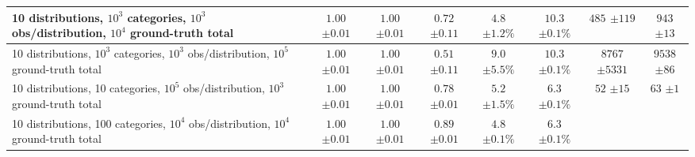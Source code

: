 \begin{table*}
\begin{center}
\begin{scriptsize}
\begin{sc}
\begin{tabular}{l||c|c|c||c|c||c|c}
\hline
\makecell{10 distributions, $10^3$ categories,\\$10^3$ obs/distribution, $10^4$ ground-truth total} & 
\makecell{$1.00$\\$\pm 0.01$} & \makecell{$1.00$\\$\pm 0.01$} & \makecell{$0.72$\\$\pm 0.11$} & 
\makecell{$4.8$\\$\pm 1.2\%$} & \makecell{$10.3$\\$\pm 0.1\%$} & 
\makecell{$485$\\$\pm 119$} & \makecell{$943$\\$\pm 13$} \\
\hline
\makecell{10 distributions, $10^3$ categories,\\$10^3$ obs/distribution, $10^5$ ground-truth total} & 
\makecell{$1.00$\\$\pm 0.01$} & \makecell{$1.00$\\$\pm 0.01$} & \makecell{$0.51$\\$\pm 0.11$} & 
\makecell{$9.0$\\$\pm 5.5\%$} & \makecell{$10.3$\\$\pm 0.1\%$} & 
\makecell{$8767$\\$\pm 5331$} & \makecell{$9538$\\$\pm 86$} \\
\hline
\makecell{10 distributions, 10 categories,\\$10^5$ obs/distribution, $10^3$ ground-truth total} & 
\makecell{$1.00$\\$\pm 0.01$} & \makecell{$1.00$\\$\pm 0.01$} & \makecell{$0.78$\\$\pm 0.01$} & 
\makecell{$5.2$\\$\pm 1.5\%$} & \makecell{$6.3$\\$\pm 0.1\%$} & 
\makecell{$52$\\$\pm 15$} & \makecell{$63$\\$\pm 1$} \\
\hline
\makecell{10 distributions, 100 categories,\\$10^4$ obs/distribution, $10^4$ ground-truth total} & 
\makecell{$1.00$\\$\pm 0.01$} & \makecell{$1.00$\\$\pm 0.01$} & \makecell{$0.89$\\$\pm 0.01$} & 
\makecell{$4.8$\\$\pm 0.1\%$} & \makecell{$6.3$\\$\pm 0.1\%$} & 

\end{tabular}
\end{sc}
\end{scriptsize}
\end{center}
\end{table*}
